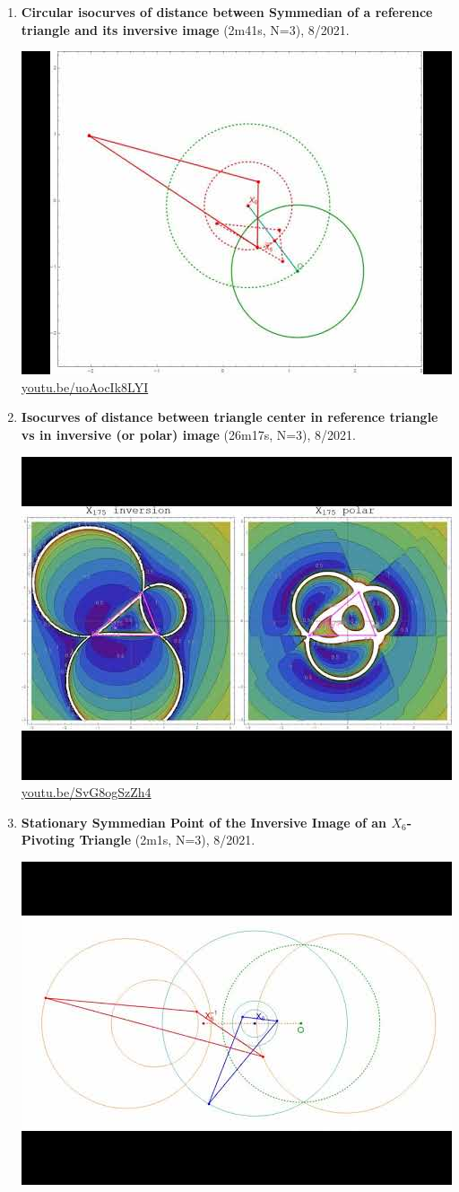 \documentclass[12pt]{amsart}
\begin{document}
\begin{enumerate}[resume]
\item \textbf{Circular isocurves of distance between Symmedian of a reference triangle and its inversive image} (2m41s, N=3), 8/2021. 
\begin{center}\includegraphics[width=.5\textwidth]{pics/uoAocIk8LYI.jpg} \\ 
\href{https://youtu.be/uoAocIk8LYI}{\url{youtu.be/uoAocIk8LYI}}\end{center}
% 
\item \textbf{Isocurves of distance between triangle center in reference triangle vs in inversive (or polar) image} (26m17s, N=3), 8/2021. 
\begin{center}\includegraphics[width=.5\textwidth]{pics/SvG8ogSzZh4.jpg} \\ 
\href{https://youtu.be/SvG8ogSzZh4}{\url{youtu.be/SvG8ogSzZh4}}\end{center}
% 
\item \textbf{Stationary Symmedian Point of the Inversive Image of an $X_{6}$-Pivoting Triangle} (2m1s, N=3), 8/2021. 
\begin{center}\includegraphics[width=.5\textwidth]{pics/GLRZSbzzP1U.jpg} \\ 

\end{center}
\end{enumerate}
\end{document}
